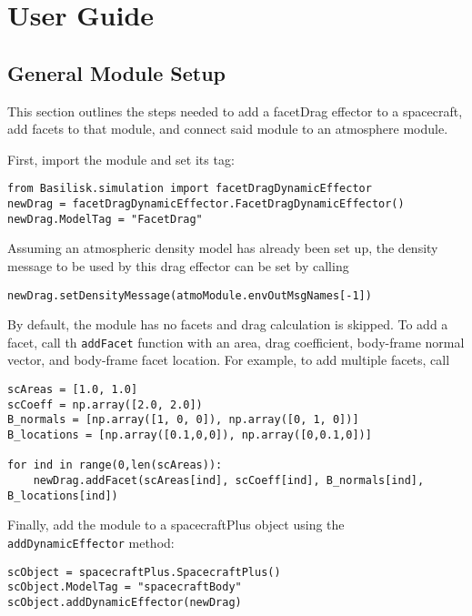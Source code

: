 
\section{User Guide}

\subsection{General Module Setup}
This section outlines the steps needed to add a facetDrag effector to a spacecraft, add facets to that module, and connect said module to an atmosphere module.

First, import the module and set its tag:
\begin{verbatim}
from Basilisk.simulation import facetDragDynamicEffector
newDrag = facetDragDynamicEffector.FacetDragDynamicEffector()
newDrag.ModelTag = "FacetDrag"
\end{verbatim}

Assuming an atmospheric density model has already been set up, the density message to be used by this drag effector can be set by calling
\begin{verbatim}
newDrag.setDensityMessage(atmoModule.envOutMsgNames[-1])
\end{verbatim}

By default, the module has no facets and drag calculation is skipped. To add a facet, call th \verb|addFacet| function with an area, drag coefficient, body-frame normal vector, and body-frame facet location. For example, to add multiple facets, call
\begin{verbatim}
scAreas = [1.0, 1.0]
scCoeff = np.array([2.0, 2.0])
B_normals = [np.array([1, 0, 0]), np.array([0, 1, 0])]
B_locations = [np.array([0.1,0,0]), np.array([0,0.1,0])]

for ind in range(0,len(scAreas)):
	newDrag.addFacet(scAreas[ind], scCoeff[ind], B_normals[ind], B_locations[ind])
\end{verbatim}


Finally, add the module to a spacecraftPlus object using the \verb|addDynamicEffector| method:
\begin{verbatim}
scObject = spacecraftPlus.SpacecraftPlus()
scObject.ModelTag = "spacecraftBody"
scObject.addDynamicEffector(newDrag)
\end{verbatim}

